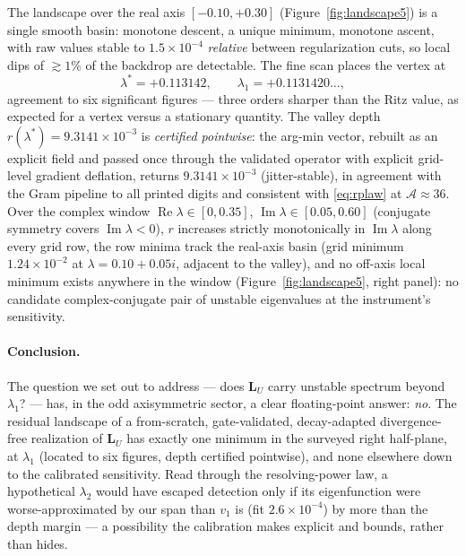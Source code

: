 \documentclass[11pt]{article}
\newcommand{\LU}{\mathbf{L}_{U}}
\theoremstyle{plain}
\theoremstyle{remark}
\begin{document}
The landscape over the real axis $[-0.10, +0.30]$
(Figure~\ref{fig:landscape5}) is a single smooth basin: monotone
descent, a unique minimum, monotone ascent, with raw values stable to
$1.5\times 10^{-4}$ \emph{relative} between regularization cuts, so
local dips of $\gtrsim 1\%$ of the backdrop are detectable. The fine
scan places the vertex at
\[
\lambda^\ast = +0.113142, \qquad
\lambda_1 = +0.1131420\ldots,
\]
agreement to six significant figures --- three orders sharper than the
Ritz value, as expected for a vertex versus a stationary quantity. The
valley depth $r(\lambda^\ast) = 9.3141\times 10^{-3}$ is
\emph{certified pointwise}: the arg-min vector, rebuilt as an explicit
field and passed once through the validated operator with explicit
grid-level gradient deflation, returns $9.3141\times 10^{-3}$
(jitter-stable), in agreement with the Gram pipeline to all printed
digits and consistent with \eqref{eq:rplaw} at
$\mathcal{A} \approx 36$. Over the complex window
$\operatorname{Re}\lambda \in [0, 0.35]$,
$\operatorname{Im}\lambda \in [0.05, 0.60]$ (conjugate symmetry
covers $\operatorname{Im}\lambda < 0$), $r$ increases strictly
monotonically in $\operatorname{Im}\lambda$ along every grid row, the
row minima track the real-axis basin (grid minimum
$1.24\times 10^{-2}$ at $\lambda = 0.10 + 0.05i$, adjacent to the
valley), and no off-axis local minimum exists anywhere in the window
(Figure~\ref{fig:landscape5}, right panel): no candidate
complex-conjugate pair of unstable eigenvalues at the instrument's
sensitivity.

\paragraph{Conclusion.} The question we set out to address ---
does $\LU$ carry unstable spectrum beyond $\lambda_1$? --- has, in the
odd axisymmetric sector, a clear floating-point answer: \emph{no}. The
residual landscape of a from-scratch, gate-validated, decay-adapted
divergence-free realization of $\LU$ has exactly one minimum in the
surveyed right half-plane, at $\lambda_1$ (located to six figures,
depth certified pointwise), and none elsewhere down to the calibrated
sensitivity. Read through the resolving-power law, a hypothetical
$\lambda_2$ would have escaped detection only if its eigenfunction were
worse-approximated by our span than $v_1$ is (fit
$2.6\times10^{-4}$) by more than the depth margin --- a possibility the
calibration makes explicit and bounds, rather than hides.
\end{document}
